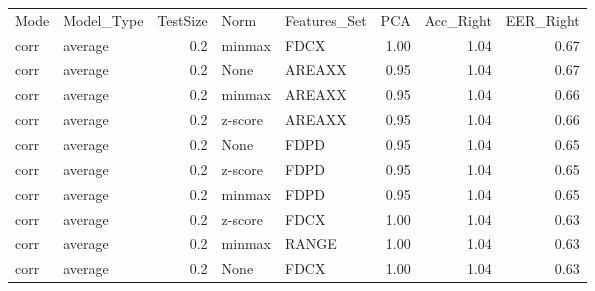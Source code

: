 \begin{tabular}{llrllrrr}
\toprule
Mode & Model\_Type &  TestSize &    Norm & Features\_Set &  PCA &  Acc\_Right &  EER\_Right \\
corr &    average &       0.2 &  minmax &         FDCX & 1.00 &       1.04 &       0.67 \\
\midrule
corr &    average &       0.2 &    None &       AREAXX & 0.95 &       1.04 &       0.67 \\
corr &    average &       0.2 &  minmax &       AREAXX & 0.95 &       1.04 &       0.66 \\
corr &    average &       0.2 & z-score &       AREAXX & 0.95 &       1.04 &       0.66 \\
corr &    average &       0.2 &    None &         FDPD & 0.95 &       1.04 &       0.65 \\
corr &    average &       0.2 & z-score &         FDPD & 0.95 &       1.04 &       0.65 \\
corr &    average &       0.2 &  minmax &         FDPD & 0.95 &       1.04 &       0.65 \\
corr &    average &       0.2 & z-score &         FDCX & 1.00 &       1.04 &       0.63 \\
corr &    average &       0.2 &  minmax &        RANGE & 1.00 &       1.04 &       0.63 \\
corr &    average &       0.2 &    None &         FDCX & 1.00 &       1.04 &       0.63 \\
\bottomrule
\end{tabular}
